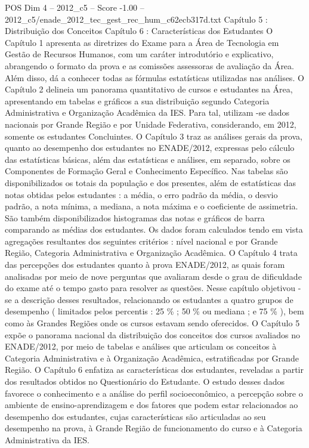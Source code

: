 \begin{textsample}{POS Dim 4 – 2012\_c5 – Score -1.00 – 2012\_c5/enade\_2012\_tec\_gest\_rec\_hum\_c62ecb317d.txt}  \label{ex:f4_pos_253}
Capítulo 5 : Distribuição dos Conceitos Capítulo 6 : Características dos Estudantes O Capítulo 1 apresenta as diretrizes do Exame para a Área de Tecnologia em Gestão de Recursos Humanos, com um caráter introdutório e explicativo, abrangendo o formato da prova e as comissões assessoras de avaliação da Área.
Além disso, dá a conhecer todas as fórmulas estatísticas utilizadas nas análises.
O Capítulo 2 delineia um panorama quantitativo de cursos e estudantes na Área, apresentando em tabelas e gráficos a sua distribuição segundo Categoria Administrativa e Organização Acadêmica da IES.
Para tal, utilizam -se dados nacionais por Grande Região e por Unidade Federativa, considerando, em 2012, somente os estudantes Concluintes.
O Capítulo 3 traz as análises gerais da prova, quanto ao desempenho dos estudantes no ENADE/2012, expressas pelo cálculo das estatísticas básicas, além das estatísticas e análises, em separado, sobre os Componentes de Formação Geral e Conhecimento Específico.
Nas tabelas são disponibilizados os totais da população e dos presentes, além de estatísticas das notas obtidas pelos estudantes : a média, o erro padrão da média, o desvio padrão, a nota mínima, a mediana, a nota máxima e o coeficiente de assimetria.
São também disponibilizados histogramas das notas e gráficos de barra comparando as médias dos estudantes.
Os dados foram calculados tendo em vista agregações resultantes dos seguintes critérios : nível nacional e por Grande Região, Categoria Administrativa e Organização Acadêmica.
O Capítulo 4 trata das percepções dos estudantes quanto à prova ENADE/2012, as quais foram analisadas por meio de nove perguntas que avaliaram desde o grau de dificuldade do exame até o tempo gasto para resolver as questões.
Nesse capítulo objetivou -se a descrição desses resultados, relacionando os estudantes a quatro grupos de desempenho ( limitados pelos percentis : 25 \% ; 50 \% ou mediana ; e 75 \% ), bem como às Grandes Regiões onde os cursos estavam sendo oferecidos.
O Capítulo 5 expõe o panorama nacional da distribuição dos conceitos dos cursos avaliados no ENADE/2012, por meio de tabelas e análises que articulam os conceitos à Categoria Administrativa e à Organização Acadêmica, estratificadas por Grande Região.
O Capítulo 6 enfatiza as características dos estudantes, reveladas a partir dos resultados obtidos no Questionário do Estudante.
O estudo desses dados favorece o conhecimento e a análise do perfil socioeconômico, a percepção sobre o ambiente de ensino-aprendizagem e dos fatores que podem estar relacionados ao desempenho dos estudantes, cujas características são articuladas ao seu desempenho na prova, à Grande Região de funcionamento do curso e à Categoria Administrativa da IES.

\end{textsample}
